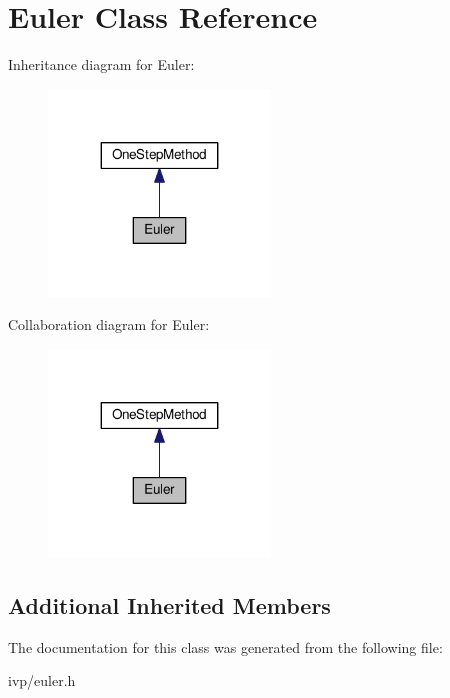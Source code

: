 \hypertarget{classEuler}{}\section{Euler Class Reference}
\label{classEuler}


Inheritance diagram for Euler\+:\nopagebreak
\begin{figure}[H]
\begin{center}
\leavevmode
\includegraphics[width=167pt]{classEuler__inherit__graph}
\end{center}
\end{figure}


Collaboration diagram for Euler\+:\nopagebreak
\begin{figure}[H]
\begin{center}
\leavevmode
\includegraphics[width=167pt]{classEuler__coll__graph}
\end{center}
\end{figure}
\subsection*{Additional Inherited Members}


The documentation for this class was generated from the following file\+:\begin{DoxyCompactItemize}
\item 
ivp/euler.\+h\end{DoxyCompactItemize}
